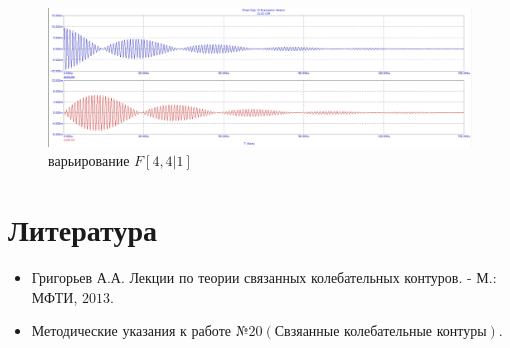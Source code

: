 \documentclass[a4paper, 14pt]{extarticle}%
\begin{document}
\begin{figure}[h]
	\centering
			\includegraphics[width=1.1\linewidth]{2.3_varF4.jpg}
            \caption{варьирование $F  [4, 4|1]$}
	\label{A}
\end{figure}

\newpage

\section{Литература}

\begin{itemize}

\item Григорьев А.А. Лекции по теории связанных колебательных контуров. - М.: МФТИ, $2013 .$

\item Методические указания к работе №$20 (\text{Свзяанные колебательные контуры})$.

\end{itemize}
\end{document}
